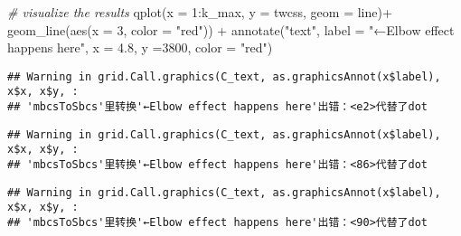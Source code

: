 \documentclass[
]{article}
\newenvironment{Shaded}{\begin{snugshade}}{\end{snugshade}}
\newcommand{\AttributeTok}[1]{\textcolor[rgb]{0.77,0.63,0.00}{#1}}
\newcommand{\CommentTok}[1]{\textcolor[rgb]{0.56,0.35,0.01}{\textit{#1}}}
\newcommand{\ControlFlowTok}[1]{\textcolor[rgb]{0.13,0.29,0.53}{\textbf{#1}}}
\newcommand{\DecValTok}[1]{\textcolor[rgb]{0.00,0.00,0.81}{#1}}
\newcommand{\FloatTok}[1]{\textcolor[rgb]{0.00,0.00,0.81}{#1}}
\newcommand{\FunctionTok}[1]{\textcolor[rgb]{0.00,0.00,0.00}{#1}}
\newcommand{\NormalTok}[1]{#1}
\newcommand{\OtherTok}[1]{\textcolor[rgb]{0.56,0.35,0.01}{#1}}
\newcommand{\SpecialCharTok}[1]{\textcolor[rgb]{0.00,0.00,0.00}{#1}}
\newcommand{\StringTok}[1]{\textcolor[rgb]{0.31,0.60,0.02}{#1}}
\begin{document}
\begin{Shaded}
\end{Shaded}

\begin{Shaded}
\begin{Highlighting}[]
\CommentTok{\# visualize the results}
\FunctionTok{qplot}\NormalTok{(}\AttributeTok{x =} \DecValTok{1}\SpecialCharTok{:}\NormalTok{k\_max, }\AttributeTok{y =}\NormalTok{ twcss, }\AttributeTok{geom =} \StringTok{\textquotesingle{}line\textquotesingle{}}\NormalTok{)}\SpecialCharTok{+}
  \FunctionTok{geom\_line}\NormalTok{(}\FunctionTok{aes}\NormalTok{(}\AttributeTok{x =} \DecValTok{3}\NormalTok{, }\AttributeTok{color =} \StringTok{"red"}\NormalTok{)) }\SpecialCharTok{+}
  \FunctionTok{annotate}\NormalTok{(}\StringTok{"text"}\NormalTok{, }
           \AttributeTok{label =} 
             \StringTok{"←Elbow effect happens here"}\NormalTok{, }
           \AttributeTok{x =} \FloatTok{4.8}\NormalTok{, }\AttributeTok{y =}\DecValTok{3800}\NormalTok{, }\AttributeTok{color =} \StringTok{"red"}\NormalTok{) }
\end{Highlighting}
\end{Shaded}

\begin{verbatim}
## Warning in grid.Call.graphics(C_text, as.graphicsAnnot(x$label), x$x, x$y, :
## 'mbcsToSbcs'里转换'←Elbow effect happens here'出错：<e2>代替了dot
\end{verbatim}

\begin{verbatim}
## Warning in grid.Call.graphics(C_text, as.graphicsAnnot(x$label), x$x, x$y, :
## 'mbcsToSbcs'里转换'←Elbow effect happens here'出错：<86>代替了dot
\end{verbatim}

\begin{verbatim}
## Warning in grid.Call.graphics(C_text, as.graphicsAnnot(x$label), x$x, x$y, :
## 'mbcsToSbcs'里转换'←Elbow effect happens here'出错：<90>代替了dot
\end{verbatim}
\end{document}
